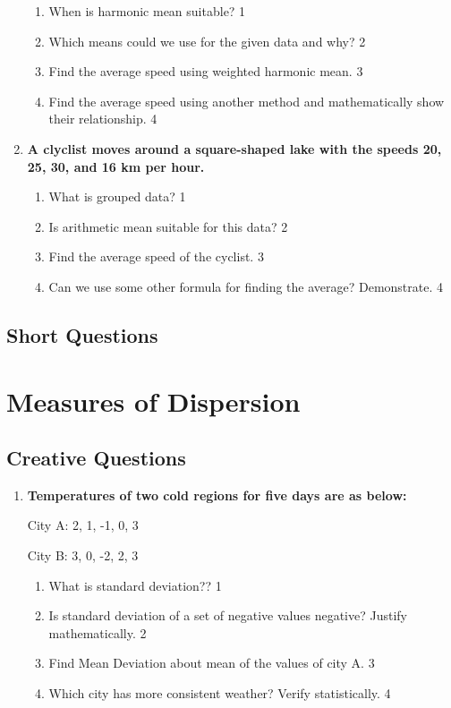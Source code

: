 \documentclass[a4paper,oneside]{book}
\begin{document}
\begin{enumerate}
  \begin{enumerate}
    \item
	When is harmonic mean suitable? \hfill 1
    \item
	Which means could we use for the given data and why? \hfill 2
    \item  
	Find the average speed using weighted harmonic mean. \hfill 3
    \item
	Find the average speed using another method and mathematically show their relationship. \hfill 4
  \end{enumerate}

 \item
	  \textbf{A clyclist moves around a square-shaped lake with the speeds 20, 25, 30, and 16 km per hour.} 
  
  \begin{enumerate}
    \item
	What is grouped data? \hfill 1
    \item
	Is arithmetic mean suitable for this data? \hfill 2
    \item  
	Find the average speed of the cyclist. \hfill 3
    \item
	Can we use some other formula for finding the average? Demonstrate. \hfill 4
  \end{enumerate}


\end{enumerate}

\section{Short Questions}

\chapter{Measures of Dispersion} 
\section{Creative Questions}

\begin{enumerate}
    \item
  \textbf{Temperatures of two cold regions for five days are as below:}

    City A: 2, 1, -1, 0, 3

    City B: 3, 0, -2, 2, 3
  \begin{enumerate}
    \item
	What is standard deviation?? \hfill 1
    \item
	Is standard deviation of a set of negative values negative? Justify mathematically. \hfill 2
    \item  
	Find Mean Deviation about mean of the values of city A.  \hfill 3
    \item
	Which city has more consistent weather? Verify statistically. \hfill 4
\end{enumerate}


\end{enumerate}
\end{document}
